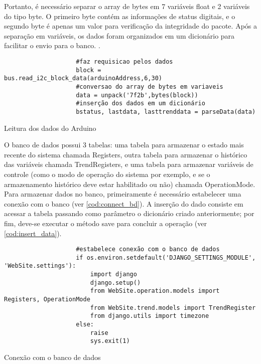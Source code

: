 				Portanto, é necessário separar o array de bytes em 7 variáveis float e 2 variáveis do tipo byte. O primeiro byte contém as informações de status digitais, e o segundo byte é apenas um valor para verificação da integridade do pacote. Após a separação em variáveis, os dados foram organizados em um dicionário para facilitar o envio para o banco. \cite{mark2013}.
				
				\begin{listing}
					\begin{verbatim}
					#faz requisicao pelos dados
					block = bus.read_i2c_block_data(arduinoAddress,6,30)
					#conversao do array de bytes em variaveis
					data = unpack('7f2b',bytes(block))
					#inserção dos dados em um dicionário
					bstatus, lastdata, lasttrenddata = parseData(data)			
					\end{verbatim}
					\caption{Leitura dos dados do Arduino}
					\label{cod:read_arduino}
				\end{listing}
			
				O banco de dados possui 3 tabelas: uma tabela para armazenar o estado mais recente do sistema chamada Registers, outra tabela para armazenar o histórico das variáveis chamada TrendRegisters, e uma tabela para armazenar variáveis de controle (como o modo de operação do sistema por exemplo, e se o armazenamento histórico deve estar habilitado ou não) chamada OperationMode. Para armazenar dados no banco, primeiramente é necessário estabelecer uma conexão com o banco (ver \autoref{cod:connect_bd}). A inserção do dado consiste em acessar a tabela passando como parâmetro o dicionário criado anteriormente; por fim, deve-se executar o método save para concluir a operação (ver \autoref{cod:insert_data}).
				
				\begin{listing}
					\begin{verbatim}
					#estabelece conexão com o banco de dados
					if os.environ.setdefault('DJANGO_SETTINGS_MODULE', 'WebSite.settings'):
						import django
						django.setup()
						from WebSite.operation.models import Registers, OperationMode
						from WebSite.trend.models import TrendRegister
						from django.utils import timezone
					else:
						raise
						sys.exit(1)
					\end{verbatim}
					\caption{Conexão com o banco de dados}
					\label{cod:connect_bd}
				\end{listing}
			
